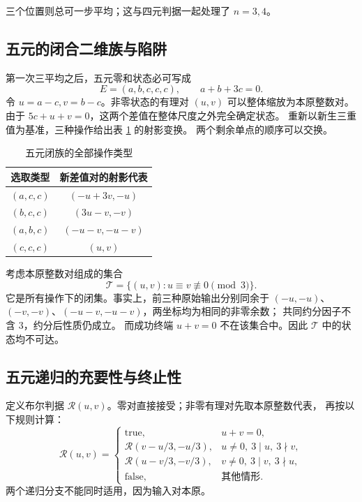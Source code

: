 \documentclass[UTF8,fontset=fandol,zihao=-4,a4paper]{ctexart}
\numberwithin{equation}{section}
\theoremstyle{definition}
\begin{document}
三个位置则总可一步平均；这与四元判据一起处理了 $n=3,4$。

\subsection{五元的闭合二维族与陷阱}

第一次三平均之后，五元零和状态必可写成
\begin{equation}\label{eq:five-family}
 E=(a,b,c,c,c),\qquad a+b+3c=0.
\end{equation}
令 $u=a-c,v=b-c$。非零状态的有理对 $(u,v)$ 可以整体缩放为本原整数对。
由于 $5c+u+v=0$，这两个差值在整体尺度之外完全确定状态。
重新以新生三重值为基准，三种操作给出表 \ref{tab:five-moves} 的射影变换。
两个剩余单点的顺序可以交换。

\begin{table}[htbp]
\centering
\caption{五元闭族的全部操作类型}\label{tab:five-moves}
\begin{tabular}{cc}
\toprule 选取类型 & 新差值对的射影代表\\\midrule
$(a,c,c)$ & $(-u+3v,-u)$\\
$(b,c,c)$ & $(3u-v,-v)$\\
$(a,b,c)$ & $(-u-v,-u-v)$\\
$(c,c,c)$ & $(u,v)$\\
\bottomrule
\end{tabular}
\end{table}

考虑本原整数对组成的集合
\begin{equation}\label{eq:five-trap}
 \mathcal T=\{(u,v):u\equiv v\not\equiv0\pmod3\}.
\end{equation}
它是所有操作下的闭集。事实上，前三种原始输出分别同余于
$(-u,-u)$、$(-v,-v)$、$(-u-v,-u-v)$，两坐标均为相同的非零余数；
共同约分因子不含 $3$，约分后性质仍成立。
而成功终端 $u+v=0$ 不在该集合中。因此 $\mathcal T$ 中的状态均不可达。

\subsection{五元递归的充要性与终止性}

定义布尔判据 $\mathscr R(u,v)$。零对直接接受；非零有理对先取本原整数代表，
再按以下规则计算：
\begin{equation}\label{eq:five-recursion}
\mathscr R(u,v)=
\begin{cases}
 \mathrm{true},&u+v=0,\\
 \mathscr R(v-u/3,-u/3),&u\ne0,\ 3\mid u,\ 3\nmid v,\\
 \mathscr R(u-v/3,-v/3),&v\ne0,\ 3\mid v,\ 3\nmid u,\\
 \mathrm{false},&\text{其他情形}.
\end{cases}
\end{equation}
两个递归分支不能同时适用，因为输入对本原。
\end{document}
